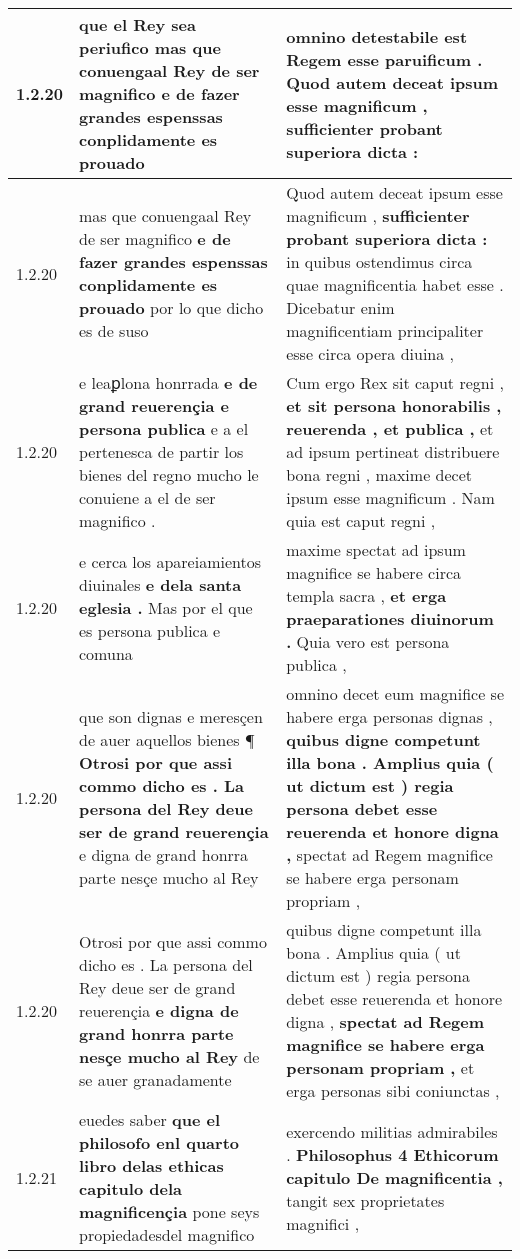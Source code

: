 \begin{tabular}{|p{1cm}|p{6.5cm}|p{6.5cm}|}
1.2.20 & que el Rey sea periufico \textbf{ mas que conuengaal Rey de ser magnifico } e de fazer grandes espenssas conplidamente es prouado & omnino detestabile est Regem esse paruificum . \textbf{ Quod autem deceat ipsum esse magnificum , } sufficienter probant superiora dicta : \\\hline
1.2.20 & mas que conuengaal Rey de ser magnifico \textbf{ e de fazer grandes espenssas conplidamente es prouado } por lo que dicho es de suso & Quod autem deceat ipsum esse magnificum , \textbf{ sufficienter probant superiora dicta : } in quibus ostendimus circa quae magnificentia habet esse . Dicebatur enim magnificentiam principaliter esse circa opera diuina , \\\hline
1.2.20 & e leaꝑlona honrrada \textbf{ e de grand reuerençia e persona publica } e a el pertenesca de partir los bienes del regno mucho le conuiene a el de ser magnifico . & Cum ergo Rex sit caput regni , \textbf{ et sit persona honorabilis , reuerenda , et publica , } et ad ipsum pertineat distribuere bona regni , maxime decet ipsum esse magnificum . Nam quia est caput regni , \\\hline
1.2.20 & e cerca los apareiamientos diuinales \textbf{ e dela santa eglesia . } Mas por el que es persona publica e comuna & maxime spectat ad ipsum magnifice se habere circa templa sacra , \textbf{ et erga praeparationes diuinorum . } Quia vero est persona publica , \\\hline
1.2.20 & que son dignas e meresçen de auer aquellos bienes ¶ \textbf{ Otrosi por que assi commo dicho es . La persona del Rey deue ser de grand reuerençia } e digna de grand honrra parte nesçe mucho al Rey & omnino decet eum magnifice se habere erga personas dignas , \textbf{ quibus digne competunt illa bona . Amplius quia ( ut dictum est ) regia persona debet esse reuerenda et honore digna , } spectat ad Regem magnifice se habere erga personam propriam , \\\hline
1.2.20 & Otrosi por que assi commo dicho es . La persona del Rey deue ser de grand reuerençia \textbf{ e digna de grand honrra parte nesçe mucho al Rey } de se auer granadamente & quibus digne competunt illa bona . Amplius quia ( ut dictum est ) regia persona debet esse reuerenda et honore digna , \textbf{ spectat ad Regem magnifice se habere erga personam propriam , } et erga personas sibi coniunctas , \\\hline
1.2.21 & euedes saber \textbf{ que el philosofo enl quarto libro delas ethicas capitulo dela magnificençia } pone seys propiedadesdel magnifico & exercendo militias admirabiles . \textbf{ Philosophus 4 Ethicorum capitulo De magnificentia , } tangit sex proprietates magnifici , \\\hline

\end{tabular}
